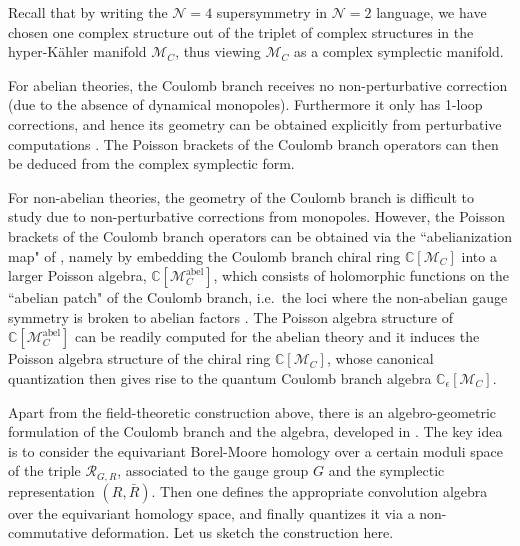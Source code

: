 \documentclass[12pt,a4paper]{article}
\renewcommand{\(}{\left(}
\renewcommand{\)}{\right)}
\newcommand{\eps}{\epsilon}
\renewcommand{\(}{\left(}
\renewcommand{\)}{\right)}
\begin{document}
Recall that by writing the $\mathcal{N}=4$ supersymmetry in $\mathcal{N}=2$ language, we have chosen one complex structure out of the triplet of complex structures in the hyper-K\"ahler manifold $\mathcal{M}_C$, thus viewing $\mathcal{M}_C$ as a complex symplectic manifold.

For abelian theories, the Coulomb branch receives no non-perturbative correction (due to the absence of dynamical monopoles). Furthermore it only has 1-loop corrections, and hence its geometry can be obtained explicitly from perturbative computations \cite{Seiberg_1996,Seiberg:1996nz,Intriligator:1996ex}. The Poisson brackets of the Coulomb branch operators can then be deduced from the complex symplectic form.


For non-abelian theories, the geometry of the Coulomb branch is difficult to study due to non-perturbative corrections from monopoles. 
However, the Poisson brackets of the Coulomb branch operators can be obtained via the ``abelianization map" of \cite{bullimore2015coulomb}, namely by embedding the Coulomb branch chiral ring $\mathbb{C}[\mathcal{M}_C]$ into a larger Poisson algebra, $\mathbb{C}[\mathcal{M}^{\text{abel}}_C]$, which consists of holomorphic functions on the ``abelian patch" of the Coulomb branch, i.e.\ the loci where the non-abelian gauge symmetry is broken to abelian factors \cite{bullimore2015coulomb}. 
The Poisson algebra structure of $\mathbb{C}[\mathcal{M}^{\text{abel}}_C]$ can be readily computed for the abelian theory and it induces the Poisson algebra structure of the chiral ring $\mathbb{C}[\mathcal{M}_C]$, whose canonical quantization then gives rise to the quantum Coulomb branch algebra $\mathbb{C}_\eps[\mathcal{M}_C]$.





\medskip


Apart from the field-theoretic construction above, there is an algebro-geometric formulation of the Coulomb branch and the algebra, developed in \cite{Nakajima:2015txa,Braverman:2016wma,Braverman:2016pwk}. 
The key idea is to consider the equivariant Borel-Moore homology over a certain moduli space of the triple $\mathcal{R}_{G,R}$, associated to the gauge group $G$ and the symplectic
representation $(R,\bar{R})$. 
Then one defines the appropriate convolution algebra over the equivariant homology space, and finally quantizes it via a non-commutative deformation.
Let us sketch the construction here.  
\end{document}
